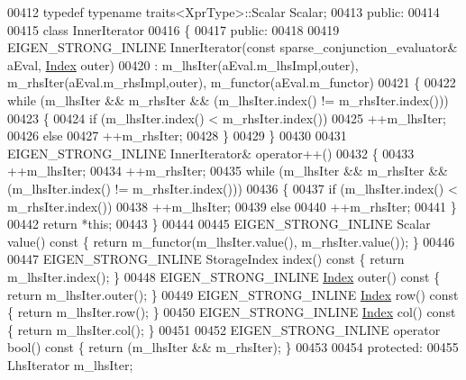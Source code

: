 \begin{DoxyCode}
00412   \textcolor{keyword}{typedef} \textcolor{keyword}{typename} traits<XprType>::Scalar Scalar;
00413 \textcolor{keyword}{public}:
00414 
00415   \textcolor{keyword}{class }InnerIterator
00416   \{
00417   \textcolor{keyword}{public}:
00418     
00419     EIGEN\_STRONG\_INLINE InnerIterator(\textcolor{keyword}{const} sparse\_conjunction\_evaluator& aEval, 
      \hyperlink{namespace_eigen_a62e77e0933482dafde8fe197d9a2cfde}{Index} outer)
00420       : m\_lhsIter(aEval.m\_lhsImpl,outer), m\_rhsIter(aEval.m\_rhsImpl,outer), m\_functor(aEval.m\_functor)
00421     \{
00422       \textcolor{keywordflow}{while} (m\_lhsIter && m\_rhsIter && (m\_lhsIter.index() != m\_rhsIter.index()))
00423       \{
00424         \textcolor{keywordflow}{if} (m\_lhsIter.index() < m\_rhsIter.index())
00425           ++m\_lhsIter;
00426         \textcolor{keywordflow}{else}
00427           ++m\_rhsIter;
00428       \}
00429     \}
00430 
00431     EIGEN\_STRONG\_INLINE InnerIterator& operator++()
00432     \{
00433       ++m\_lhsIter;
00434       ++m\_rhsIter;
00435       \textcolor{keywordflow}{while} (m\_lhsIter && m\_rhsIter && (m\_lhsIter.index() != m\_rhsIter.index()))
00436       \{
00437         \textcolor{keywordflow}{if} (m\_lhsIter.index() < m\_rhsIter.index())
00438           ++m\_lhsIter;
00439         \textcolor{keywordflow}{else}
00440           ++m\_rhsIter;
00441       \}
00442       \textcolor{keywordflow}{return} *\textcolor{keyword}{this};
00443     \}
00444     
00445     EIGEN\_STRONG\_INLINE Scalar value()\textcolor{keyword}{ const }\{ \textcolor{keywordflow}{return} m\_functor(m\_lhsIter.value(), m\_rhsIter.value()); \}
00446 
00447     EIGEN\_STRONG\_INLINE StorageIndex index()\textcolor{keyword}{ const }\{ \textcolor{keywordflow}{return} m\_lhsIter.index(); \}
00448     EIGEN\_STRONG\_INLINE \hyperlink{namespace_eigen_a62e77e0933482dafde8fe197d9a2cfde}{Index} outer()\textcolor{keyword}{ const }\{ \textcolor{keywordflow}{return} m\_lhsIter.outer(); \}
00449     EIGEN\_STRONG\_INLINE \hyperlink{namespace_eigen_a62e77e0933482dafde8fe197d9a2cfde}{Index} row()\textcolor{keyword}{ const }\{ \textcolor{keywordflow}{return} m\_lhsIter.row(); \}
00450     EIGEN\_STRONG\_INLINE \hyperlink{namespace_eigen_a62e77e0933482dafde8fe197d9a2cfde}{Index} col()\textcolor{keyword}{ const }\{ \textcolor{keywordflow}{return} m\_lhsIter.col(); \}
00451 
00452     EIGEN\_STRONG\_INLINE \textcolor{keyword}{operator} bool()\textcolor{keyword}{ const }\{ \textcolor{keywordflow}{return} (m\_lhsIter && m\_rhsIter); \}
00453 
00454   \textcolor{keyword}{protected}:
00455     LhsIterator m\_lhsIter;

\end{DoxyCode}
